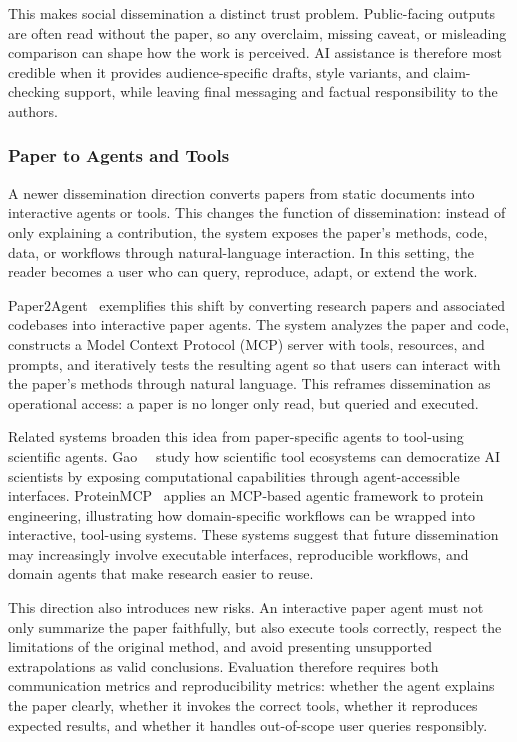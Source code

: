 This makes social dissemination a distinct trust problem. Public-facing outputs are often read without the paper, so any overclaim, missing caveat, or misleading comparison can shape how the work is perceived. AI assistance is therefore most credible when it provides audience-specific drafts, style variants, and claim-checking support, while leaving final messaging and factual responsibility to the authors.



\subsubsection{Paper to Agents and Tools}
\label{sec:paper2agent}

A newer dissemination direction converts papers from static documents into interactive agents or tools. This changes the function of dissemination: instead of only explaining a contribution, the system exposes the paper's methods, code, data, or workflows through natural-language interaction. In this setting, the reader becomes a user who can query, reproduce, adapt, or extend the work.

Paper2Agent~\cite{miao2025paper2agent} exemplifies this shift by converting research papers and associated codebases into interactive paper agents. The system analyzes the paper and code, constructs a Model Context Protocol (MCP) server with tools, resources, and prompts, and iteratively tests the resulting agent so that users can interact with the paper's methods through natural language. This reframes dissemination as operational access: a paper is no longer only read, but queried and executed.

Related systems broaden this idea from paper-specific agents to tool-using scientific agents. Gao~\etal~\cite{gao2025democratizing} study how scientific tool ecosystems can democratize AI scientists by exposing computational capabilities through agent-accessible interfaces. ProteinMCP~\cite{xu2026proteinmcp} applies an MCP-based agentic framework to protein engineering, illustrating how domain-specific workflows can be wrapped into interactive, tool-using systems. These systems suggest that future dissemination may increasingly involve executable interfaces, reproducible workflows, and domain agents that make research easier to reuse.

This direction also introduces new risks. An interactive paper agent must not only summarize the paper faithfully, but also execute tools correctly, respect the limitations of the original method, and avoid presenting unsupported extrapolations as valid conclusions. Evaluation therefore requires both communication metrics and reproducibility metrics: whether the agent explains the paper clearly, whether it invokes the correct tools, whether it reproduces expected results, and whether it handles out-of-scope user queries responsibly.




